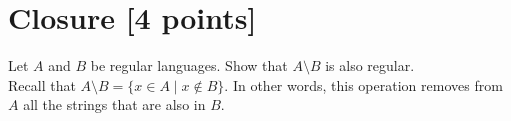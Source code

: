 \newpage
\section{Closure [4 points]}
Let $A$ and $B$ be regular languages.  Show that $A\setminus B$ is also regular.\\ 
Recall that $A\setminus B = \{x\in A \mid x \not\in B\}$. 
In other words, this operation removes from $A$ all the strings that are also in $B$.